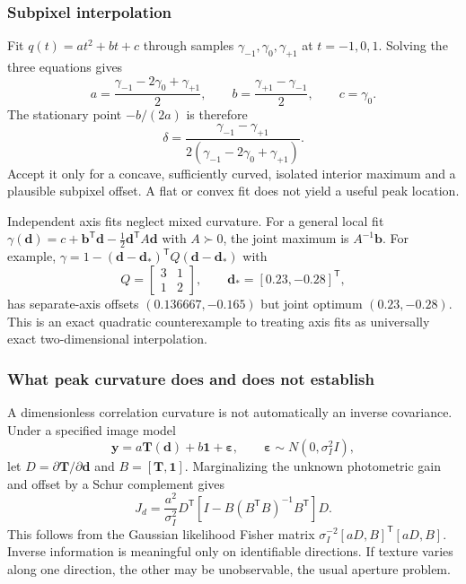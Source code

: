 \documentclass[11pt,a4paper]{article}
\numberwithin{equation}{section}
\begin{document}
\subsubsection{Subpixel interpolation}

Fit $q(t)=a t^2+b t+c$ through samples $\gamma_{-1},\gamma_0,
\gamma_{+1}$ at $t=-1,0,1$. Solving the three equations gives
\begin{equation}
 a=\frac{\gamma_{-1}-2\gamma_0+\gamma_{+1}}2,
 \qquad b=\frac{\gamma_{+1}-\gamma_{-1}}2,
 \qquad c=\gamma_0.
\end{equation}
The stationary point $-b/(2a)$ is therefore
\begin{equation}
 \delta=\frac{\gamma_{-1}-\gamma_{+1}}
          {2(\gamma_{-1}-2\gamma_0+\gamma_{+1})}.
\end{equation}
Accept it only for a concave, sufficiently curved, isolated interior
maximum and a plausible subpixel offset. A flat or convex fit does not
yield a useful peak location.

Independent axis fits neglect mixed curvature. For a general local fit
$\gamma(\boldsymbol d)=c+\boldsymbol b^{\mathsf T}\boldsymbol d
-\tfrac12\boldsymbol d^{\mathsf T}A\boldsymbol d$ with $A\succ0$,
the joint maximum is $A^{-1}\boldsymbol b$. For example,
$\gamma=1-(\boldsymbol d-\boldsymbol d_*)^{\mathsf T}
Q(\boldsymbol d-\boldsymbol d_*)$ with
\begin{equation}
 Q=\begin{bmatrix}3&1\\1&2\end{bmatrix},\qquad
 \boldsymbol d_*=[0.23,-0.28]^{\mathsf T},
\end{equation}
has separate-axis offsets $(0.136667,-0.165)$ but joint optimum
$(0.23,-0.28)$. This is an exact quadratic counterexample to treating
axis fits as universally exact two-dimensional interpolation.

\subsubsection{What peak curvature does and does not establish}

A dimensionless correlation curvature is not automatically an inverse
covariance. Under a specified image model
\begin{equation}
 \boldsymbol y=a\boldsymbol T(\boldsymbol d)+b\boldsymbol 1
                  +\boldsymbol\varepsilon,
 \qquad\boldsymbol\varepsilon\sim N(0,\sigma_I^2 I),
\end{equation}
let $D=\partial\boldsymbol T/\partial\boldsymbol d$ and
$B=[\boldsymbol T,\boldsymbol1]$. Marginalizing the unknown photometric
gain and offset by a Schur complement gives
\begin{equation}
 J_d=\frac{a^2}{\sigma_I^2}D^{\mathsf T}
 \left[I-B(B^{\mathsf T}B)^{-1}B^{\mathsf T}\right]D.
 \label{eq:photometric-fisher}
\end{equation}
This follows from the Gaussian likelihood Fisher matrix
$\sigma_I^{-2}[aD,B]^{\mathsf T}[aD,B]$. Inverse information is meaningful
only on identifiable directions. If texture varies along one direction,
the other may be unobservable, the usual aperture problem.
\end{document}
